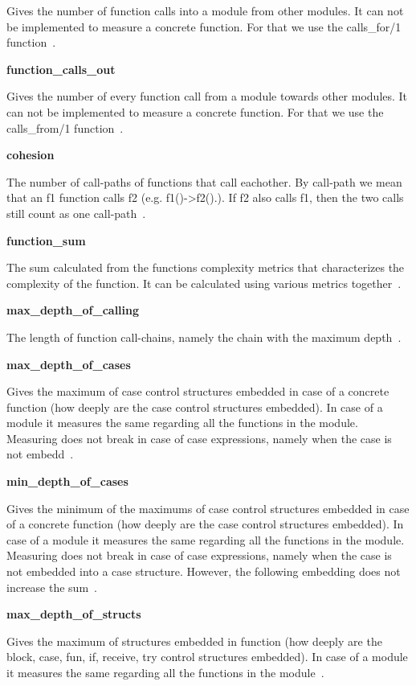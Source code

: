 Gives the number of function calls into a module from other modules. It can not be implemented to measure a concrete function. For that we use the calls\_for/1 function~\cite{refactorerlm}.

\textbf{function\_calls\_out}

Gives the number of every function call from a module towards other modules. It can not be implemented to measure a concrete function. For that we use the calls\_from/1 function~\cite{refactorerlm}.

\textbf{cohesion}

The number of call-paths of functions that call eachother. By call-path we mean that an f1 function calls f2 (e.g. f1()->f2().). If f2 also calls f1, then the two calls still count as one call-path~\cite{refactorerlm}.

\textbf{function\_sum}

The sum calculated from the functions complexity metrics that characterizes the complexity of the function. It can be calculated using various metrics together~\cite{refactorerlm}.
	 
\textbf{max\_depth\_of\_calling}

The length of function call-chains, namely the chain with the maximum depth~\cite{refactorerlm}.
	 
\textbf{max\_depth\_of\_cases}

 Gives the maximum of case control structures embedded in case of a concrete function (how deeply are the case control structures embedded). In case of a module it measures the same regarding all the functions in the module. Measuring does not break in case of case expressions, namely when the case is not embedd~\cite{refactorerlm}.

\textbf{min\_depth\_of\_cases}

 Gives the minimum of the maximums of case control structures embedded in case of a concrete function (how deeply are the case control structures embedded). In case of a module it measures the same regarding all the functions in the module. Measuring does not break in case of case expressions, namely when the case is not embedded into a case structure. However, the following embedding does not increase the sum~\cite{refactorerlm}.

\textbf{max\_depth\_of\_structs}

 Gives the maximum of structures embedded in function (how deeply are the block, case, fun, if, receive, try control structures embedded). In case of a module it measures the same regarding all the functions in the module~\cite{refactorerlm}.

